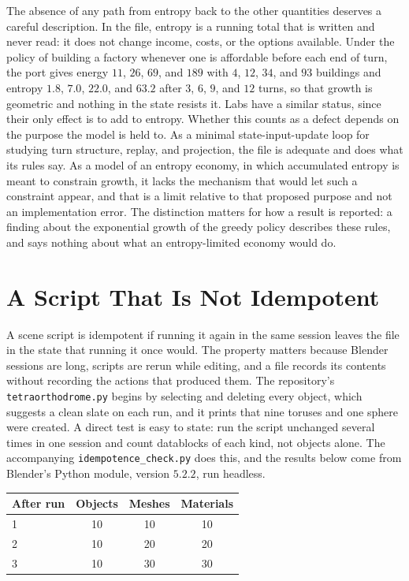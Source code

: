 The absence of any path from entropy back to the other quantities deserves a careful description. In the file, entropy is a running total that is written and never read: it does not change income, costs, or the options available. Under the policy of building a factory whenever one is affordable before each end of turn, the port gives energy $11$, $26$, $69$, and $189$ with $4$, $12$, $34$, and $93$ buildings and entropy $1.8$, $7.0$, $22.0$, and $63.2$ after $3$, $6$, $9$, and $12$ turns, so that growth is geometric and nothing in the state resists it. Labs have a similar status, since their only effect is to add to entropy. Whether this counts as a defect depends on the purpose the model is held to. As a minimal state-input-update loop for studying turn structure, replay, and projection, the file is adequate and does what its rules say. As a model of an entropy economy, in which accumulated entropy is meant to constrain growth, it lacks the mechanism that would let such a constraint appear, and that is a limit relative to that proposed purpose and not an implementation error. The distinction matters for how a result is reported: a finding about the exponential growth of the greedy policy describes these rules, and says nothing about what an entropy-limited economy would do.

\section{A Script That Is Not Idempotent}

A scene script is idempotent if running it again in the same session leaves the file in the state that running it once would. The property matters because Blender sessions are long, scripts are rerun while editing, and a file records its contents without recording the actions that produced them. The repository's \texttt{tetraorthodrome.py} begins by selecting and deleting every object, which suggests a clean slate on each run, and it prints that nine toruses and one sphere were created. A direct test is easy to state: run the script unchanged several times in one session and count datablocks of each kind, not objects alone. The accompanying \texttt{idempotence\_check.py} does this, and the results below come from Blender's Python module, version $5.2.2$, run headless.

\begin{center}
\begin{tabular}{@{}lccc@{}}
\toprule
After run & Objects & Meshes & Materials\\
\midrule
1 & 10 & 10 & 10\\
2 & 10 & 20 & 20\\
3 & 10 & 30 & 30\\
\bottomrule
\end{tabular}
\end{center}


